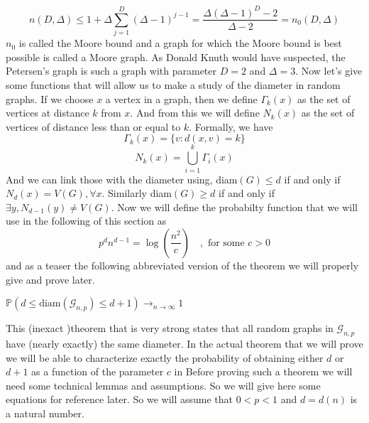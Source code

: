 \begin{equation}
	n(D, \Delta) \leq 1 + \Delta \sum_{j=1}^{D}(\Delta - 1)^{j-1} = \frac{\Delta(\Delta - 1)^D - 2}{\Delta - 2} = n_0(D, \Delta)
\end{equation}
$n_0$ is called the Moore bound and a graph for which the Moore bound is best possible is called a Moore graph. 
As Donald Knuth would have suspected, the Petersen's graph is such a graph with parameter $D= 2$ and $\Delta = 3$.
\newline
Now let's give some functions that will allow us to make a study of the diameter in random graphs. If we choose $x$ a vertex in a graph, then we define $\Gamma_k(x)$ as the set of vertices at distance $k$ from $x$. And from this we will define $N_k(x)$ as the set of vertices of distance less than or equal to $k$. 
Formally, we have
\begin{equation}
	\Gamma_k(x) = \{v : d(x, v) = k \}
\end{equation}
\begin{equation}
	N_k(x) = \bigcup_{i=1}^k \Gamma_i(x)
\end{equation}
And we can link those with the diameter using, diam$(G) \leq d $ if and only if $N_d(x) = V(G), \forall x$.
\newline
Similarly diam$(G) \geq d $ if and only if $\exists y, N_{d-1}(y) \neq V(G)$.
\newline
Now we will define the probabilty function that we will use in the following of this section as 
\begin{equation} \label{eq:pdiam}
	p^d n^{d-1} = \log(\frac{n^2}{c}) \quad, \text{  for some } c >0
\end{equation}
and as a teaser the following abbreviated version of the theorem we will properly give and prove later.
\begin{theorem}
	$\mathbb{P}(d \leq \text{diam}(\mathcal{G}_{n, p}) \leq d + 1) \longrightarrow_{n \to \infty} 1$
\end{theorem}
This (inexact )theorem that is very strong states that all random graphs in $\mathcal{G}_{n, p}$ have (nearly exactly) the same diameter.
In the actual theorem that we will prove we will be able to characterize exactly the probability of obtaining either $d$ or $d+1$ as a function of the parameter $c$ in \label{eq:diam}
\newline
Before proving such a theorem we will need some technical lemmas and assumptions. So we will give here some equations for reference later.
So we will assume that $0 < p < 1$ and $d=d(n)$ is a natural number.
